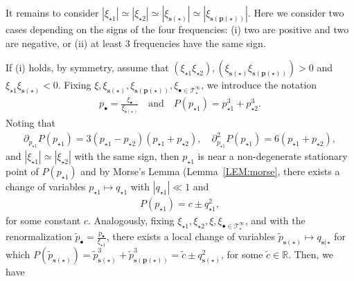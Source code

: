 \documentclass[%
11pt,  reqno]{amsart}
\newcommand{\5}{\textup{V}}
\newcommand{\wt}{\widetilde}
\theoremstyle{remark}
\newcommand{\R}{\mathbb{R}}
\newcommand{\bul}{\bullet}
\newcommand{\TT}{\mathcal{T}}
\newcommand{\pb}{\mathbf{p}}
\newcommand{\sbf}{\mathbf{s}}
\numberwithin{equation}{section}
\numberwithin{theorem}{section}
\begin{document}
It remains to consider $|\xi_{\star1}| \simeq |\xi_{\star2}| \simeq |\xi_{\sbf(\star)}| \simeq |\xi_{\sbf(\pb(\star))}| $. Here we consider two cases depending on the signs of the four frequencies: (i) two are positive and two are negative, or (ii) at least 3 frequencies have the same sign. 

If (i) holds, by symmetry, assume that $(\xi_{\star1} \xi_{\star2}), (\xi_{\sbf(\star)} \xi_{\sbf(\pb(\star))}) >0$ and $\xi_{\star1} \xi_{\sbf(\star)} < 0$.  Fixing $\xi, \xi_{\sbf(\star)},  \xi_{\sbf(\pb(\star))}, \xi_{\bul \in \TT^\infty_\star}$, we introduce the notation
\begin{align}\label{L23c}
    p_\bul = \frac{\xi_\bul}{\xi_{\sbf(\star)}} 
    \quad 
    \text{and}
    \quad 
    P(p_{\star1}) = p^3_{\star1} + p^3_{\star2}. 
\end{align}
Noting that 
\begin{align}
\partial_{p_{\star1}} P (p_{\star1}) = 3 (p_{\star1} - p_{\star2}) (p_{\star1} + p_{\star2}), 
\quad 
\partial^2_{p_{\star1}} P(p_{\star1}) = 6 (p_{\star1} + p_{\star2}), 
\end{align}
and $|\xi_{\star1}| \simeq |\xi_{\star2}|$ with the same sign, then $p_{\star1}$ is near a non-degenerate stationary point of $P(p_{\star1})$ and by Morse's Lemma (Lemma~\ref{LEM:morse}, there exists a change of variables $p_{\star1} \mapsto q_{\star1}$ with $|q_{\star1}|\ll 1$ and 
\begin{align}
    P(p_{\star1}) = c \pm q_{\star1}^2, 
\end{align}
for some constant $c$. 
Analogously, fixing $\xi_{\star1}, \xi_{\star2}, \xi, \xi_{\bul\in\TT^\infty_\star}$, and with the renormalization $\wt{p}_\bul = \frac{p_\bul}{\xi_{\star1}}$, there exists a local change of variables $\wt{p}_{\sbf(\star)} \mapsto q_{\sbf(\star}$ for which $P(\wt{p}_{\sbf(\star)}) = \wt{p}^3_{\sbf(\star)} + \wt{p}^3_{\sbf(\pb(\star))} = \wt{c} \pm q^2_{\sbf(\star)}$, for some $\wt{c}\in\R$. 
Then, we have
\end{document}
